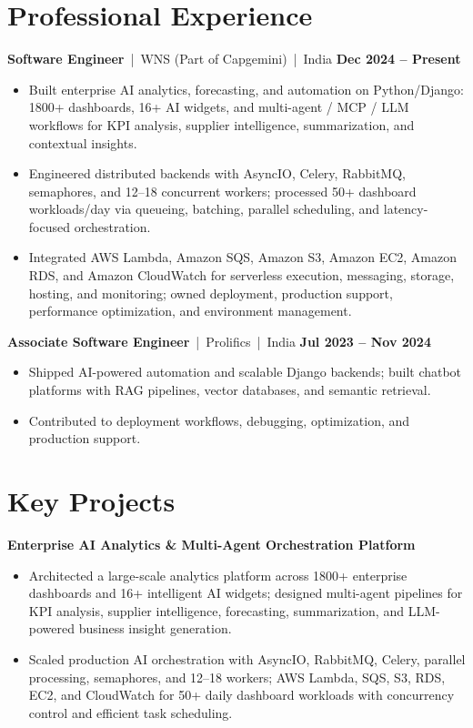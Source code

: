 \documentclass[10pt,a4paper]{article}
\newcommand{\resumeItem}[1]{\item \small #1}
\newcommand{\resumeSubheading}[4]{%
  \vspace{2pt}%
  \textbf{\normalsize #1} \textcolor{textgray}{\,|\, #3 \,|\, #4} \hfill {\small\textbf{#2}}%
  \vspace{1pt}%
}
\newcommand{\projectHeading}[1]{%
  \vspace{3pt}%
  \textbf{\small\color{primary}#1}\\[-2pt]
}
\begin{document}
\section{Professional Experience}

\resumeSubheading{Software Engineer}{Dec 2024 -- Present}{WNS (Part of Capgemini)}{India}
\begin{itemize}
  \resumeItem{Built enterprise AI analytics, forecasting, and automation on Python/Django: 1800+ dashboards, 16+ AI widgets, and multi-agent / MCP / LLM workflows for KPI analysis, supplier intelligence, summarization, and contextual insights.}
  \resumeItem{Engineered distributed backends with AsyncIO, Celery, RabbitMQ, semaphores, and 12--18 concurrent workers; processed 50+ dashboard workloads/day via queueing, batching, parallel scheduling, and latency-focused orchestration.}
  \resumeItem{Integrated AWS Lambda, Amazon SQS, Amazon S3, Amazon EC2, Amazon RDS, and Amazon CloudWatch for serverless execution, messaging, storage, hosting, and monitoring; owned deployment, production support, performance optimization, and environment management.}
\end{itemize}

\vspace{2pt}
\resumeSubheading{Associate Software Engineer}{Jul 2023 -- Nov 2024}{Prolifics}{India}
\begin{itemize}
  \resumeItem{Shipped AI-powered automation and scalable Django backends; built chatbot platforms with RAG pipelines, vector databases, and semantic retrieval.}
  \resumeItem{Contributed to deployment workflows, debugging, optimization, and production support.}
\end{itemize}

\section{Key Projects}

\projectHeading{Enterprise AI Analytics \& Multi-Agent Orchestration Platform}
\begin{itemize}
  \resumeItem{Architected a large-scale analytics platform across 1800+ enterprise dashboards and 16+ intelligent AI widgets; designed multi-agent pipelines for KPI analysis, supplier intelligence, forecasting, summarization, and LLM-powered business insight generation.}
  \resumeItem{Scaled production AI orchestration with AsyncIO, RabbitMQ, Celery, parallel processing, semaphores, and 12--18 workers; AWS Lambda, SQS, S3, RDS, EC2, and CloudWatch for 50+ daily dashboard workloads with concurrency control and efficient task scheduling.}
\end{itemize}
\end{document}
